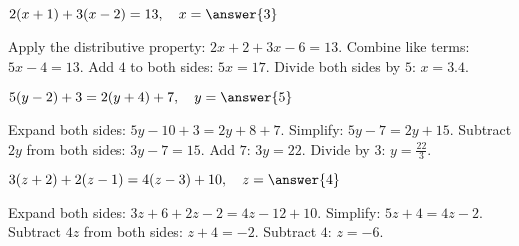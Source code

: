 \documentclass{ximera}
\begin{document}
\begin{problem}
$2(x + 1) + 3(x - 2) = 13,\quad x = \answer{3}$
\begin{feedback}
Apply the distributive property: $2x + 2 + 3x - 6 = 13$. Combine like terms: $5x - 4 = 13$. Add $4$ to both sides: $5x = 17$. Divide both sides by $5$: $x = 3.4$.
\end{feedback}
\end{problem}

\begin{problem}
$5(y - 2) + 3 = 2(y + 4) + 7,\quad y = \answer{5}$
\begin{feedback}
Expand both sides: $5y - 10 + 3 = 2y + 8 + 7$. Simplify: $5y - 7 = 2y + 15$. Subtract $2y$ from both sides: $3y - 7 = 15$. Add $7$: $3y = 22$. Divide by $3$: $y = \frac{22}{3}$.
\end{feedback}
\end{problem}

\begin{problem}
$3(z + 2) + 2(z - 1) = 4(z - 3) + 10,\quad z = \answer{4}$
\begin{feedback}
Expand both sides: $3z + 6 + 2z - 2 = 4z - 12 + 10$. Simplify: $5z + 4 = 4z - 2$. Subtract $4z$ from both sides: $z + 4 = -2$. Subtract $4$: $z = -6$.
\end{feedback}
\end{problem}

\end{document}

